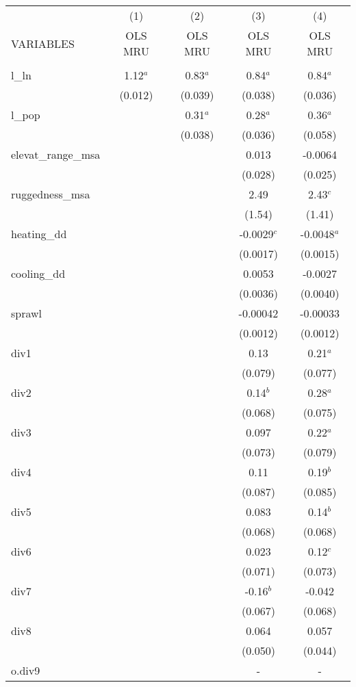 \documentclass[]{article}
\begin{document}
\begin{tabular}{lcccc} \hline
 & (1) & (2) & (3) & (4) \\
VARIABLES & OLS MRU & OLS MRU & OLS MRU & OLS MRU \\ \hline
 &  &  &  &  \\
l\_ln & 1.12$^a$ & 0.83$^a$ & 0.84$^a$ & 0.84$^a$ \\
 & (0.012) & (0.039) & (0.038) & (0.036) \\
l\_pop &  & 0.31$^a$ & 0.28$^a$ & 0.36$^a$ \\
 &  & (0.038) & (0.036) & (0.058) \\
elevat\_range\_msa &  &  & 0.013 & -0.0064 \\
 &  &  & (0.028) & (0.025) \\
ruggedness\_msa &  &  & 2.49 & 2.43$^c$ \\
 &  &  & (1.54) & (1.41) \\
heating\_dd &  &  & -0.0029$^c$ & -0.0048$^a$ \\
 &  &  & (0.0017) & (0.0015) \\
cooling\_dd &  &  & 0.0053 & -0.0027 \\
 &  &  & (0.0036) & (0.0040) \\
sprawl &  &  & -0.00042 & -0.00033 \\
 &  &  & (0.0012) & (0.0012) \\
div1 &  &  & 0.13 & 0.21$^a$ \\
 &  &  & (0.079) & (0.077) \\
div2 &  &  & 0.14$^b$ & 0.28$^a$ \\
 &  &  & (0.068) & (0.075) \\
div3 &  &  & 0.097 & 0.22$^a$ \\
 &  &  & (0.073) & (0.079) \\
div4 &  &  & 0.11 & 0.19$^b$ \\
 &  &  & (0.087) & (0.085) \\
div5 &  &  & 0.083 & 0.14$^b$ \\
 &  &  & (0.068) & (0.068) \\
div6 &  &  & 0.023 & 0.12$^c$ \\
 &  &  & (0.071) & (0.073) \\
div7 &  &  & -0.16$^b$ & -0.042 \\
 &  &  & (0.067) & (0.068) \\
div8 &  &  & 0.064 & 0.057 \\
 &  &  & (0.050) & (0.044) \\
o.div9 &  &  & - & - \\

\end{tabular}
\end{document}
